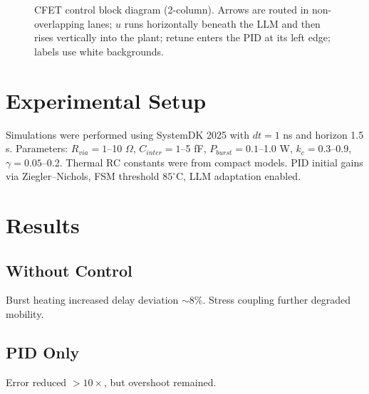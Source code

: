 \documentclass[conference]{IEEEtran}
\begin{document}
\begin{figure}[!t]
{%
}
\caption{CFET control block diagram (2-column). Arrows are routed in non-overlapping lanes; $u$ runs horizontally beneath the LLM and then rises vertically into the plant; retune enters the PID at its left edge; labels use white backgrounds.}
\label{fig:model_tikz}
\end{figure}

\section{Experimental Setup}
Simulations were performed using SystemDK 2025 with $dt=1$ ns and horizon 1.5 s. Parameters:  
$R_{via}=1$--10 $\Omega$, $C_{inter}=1$--5 fF, $P_{burst}=0.1$--1.0 W, $k_c=0.3$--0.9, $\gamma=0.05$--0.2.  
Thermal RC constants were from compact models. PID initial gains via Ziegler–Nichols, FSM threshold $85^\circ$C, LLM adaptation enabled.

\section{Results}
\subsection{Without Control}
Burst heating increased delay deviation $\sim$8\%. Stress coupling further degraded mobility.  

\subsection{PID Only}
Error reduced $>10\times$, but overshoot remained.  
\end{document}
